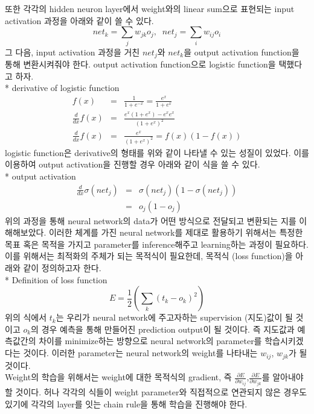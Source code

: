 \documentclass[draft=false]{oblivoir}
\begin{document}
또한 각각의 hidden neuron layer에서 weight와의 linear sum으로 표현되는 input activation 과정을 아래와 같이 쓸 수 있다. 
\begin{equation}
net_{k} = \sum_{j}w_{jk}o_{j},\;\; net_{j} = \sum_{i}w_{ij}o_{i}
\end{equation}
그 다음, input activation 과정을 거친 $net_{j}$와 $net_{k}$을 output  activation function을 통해 변환시켜줘야 한다. output activation function으로 logistic function을 택했다고 하자. \\
* derivative of logistic function 
\begin{eqnarray}
f(x) & = &  \frac{1}{1+e^{-x}} = \frac{e^{x}}{1+e^{x}}\\ 
\frac{d}{dx}f(x) & = & \frac{e^{x}(1+e^{x})-e^{x}e^{x}}{(1+e^{x})^{2}}\\
\frac{d}{dx}f(x) & = & \frac{e^{x}}{(1+e^{x})^{2}} = f(x)(1-f(x))
\end{eqnarray}
logistic function은 derivative의 형태를 위와 같이 나타낼 수 있는 성질이 있었다. 이를 이용하여 output activation을 진행할 경우 아래와 같이 식을 쓸 수 있다. \\
* output activation
\begin{eqnarray}
\frac{d}{dx}\sigma(net_{j}) & = &  \sigma(net_{j})(1-\sigma(net_{j}))\\
&=& o_{j}(1-o_{j})
\end{eqnarray}
위의 과정을 통해 neural network의 data가 어떤 방식으로 전달되고 변환되는 지를 이해해보았다. 이러한 체계를 가진 neural network를 제대로 활용하기 위해서는 특정한 목표 혹은 목적을 가지고 parameter를 inference해주고 learning하는 과정이 필요하다. 이를 위해서는 최적화의 주체가 되는 목적식이 필요한데, 목적식 (loss function)을 아래와 같이 정의하고자 한다.\\
* Definition of loss function
\begin{equation}
E = \frac{1}{2}(\sum_{k}(t_{k}-o_{k})^{2})
\end{equation}
위의 식에서 $t_{k}$는 우리가 neural network에 주고자하는 supervision (지도)값이 될 것이고 $o_{k}$의 경우 예측을 통해 만들어진 prediction output이 될 것이다. 즉 지도값과 예측값간의 차이를 minimize하는 방향으로 neural network의 parameter를 학습시키겠다는 것이다. 이러한 parameter는 neural network의  weight를 나타내는 $w_{ij}$, $w_{jk}$가 될 것이다. \\
Weight의 학습을 위해서는 weight에 대한 목적식의 gradient, 즉 $\frac{\partial E}{\partial w_{ij}}$,$\frac{\partial E}{\partial w_{jk}}$를 알아내야 할 것이다. 허나 각각의 식들이 weight parameter와 직접적으로 연관되지 않은 경우도 있기에 각각의 layer를 잇는 chain rule을 통해 학습을 진행해야 한다.
\end{document}
